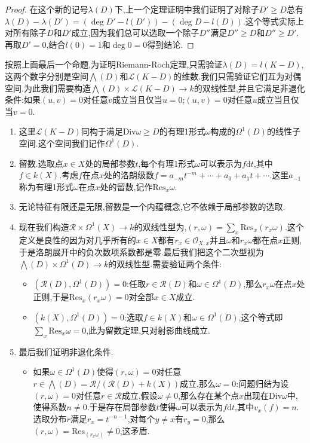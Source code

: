 \begin{enumerate}
\begin{proof}
    	在这个新的记号$\lambda(D)$下,上一个定理证明中我们证明了对除子$D'\ge D$总有$\lambda(D)-\lambda(D')=(\deg D'-l(D'))-(\deg D-l(D))$.这个等式实际上对所有除子$D$和$D'$成立,因为我们总可以选取一个除子$D''$满足$D''\ge D$和$D''\ge D'$.再取$D'=0$,结合$l(0)=1$和$\deg 0=0$得到结论.
    \end{proof}
\end{enumerate}

按照上面最后一个命题,为证明Riemann-Roch定理,只需验证$\lambda(D)=l(K-D)$,这两个数字分别是空间$\bigwedge(D)$和$\mathscr{L}(K-D)$的维数.我们只需验证它们互为对偶空间.为此我们需要构造$\bigwedge(D)\times\mathscr{L}(K-D)\to k$的双线性型,并且它满足非退化条件:如果$(u,v)=0$对任意$v$成立当且仅当$u=0$;$(u,v)=0$对任意$u$成立当且仅当$v=0$.
\begin{enumerate}
	\item 这里$\mathscr{L}(K-D)$同构于满足$\mathrm{Div}\omega\ge D$的有理1形式$\omega$构成的$\Omega^1(D)$的线性子空间.这个空间我们记作$\Omega^1(D)$.
	\item 留数.选取点$x\in X$处的局部参数$t$,每个有理1形式$\omega$可以表示为$f\mathrm{d}t$,其中$f\in k(X)$.考虑$f$在点$x$处的洛朗级数$f=a_{-m}t^{-m}+\cdots+a_0+a_1t+\cdots$.这里$a_{-1}$称为有理1形式$\omega$在点$x$处的留数,记作$\mathrm{Res}_x\omega$.
	\item 无论特征有限还是无限,留数是一个内蕴概念,它不依赖于局部参数的选取.
	\item 现在我们构造$\mathscr{R}\times\Omega^1(X)\to k$的双线性型为,$(r,\omega)=\sum_x\mathrm{Res}_x(r_x\omega)$.这个定义是良性的因为对几乎所有的$x\in X$都有$r_x\in\mathscr{O}_{X,x}$并且$\omega$和$r_x\omega$都在点$x$正则,于是洛朗展开中的负次数项系数都是零.最后我们把这个二次型视为$\bigwedge(D)\times\Omega^1(D)\to k$的双线性型.需要验证两个条件:
	\begin{itemize}
		\item $(\mathscr{R}(D),\Omega^1(D))=0$:任取$r\in\mathscr{R}(D)$和$\omega\in\Omega^1(D)$,那么$r_x\omega$在点$x$处正则,于是$\mathrm{Res}_x(r_x\omega)=0$对全部$x\in X$成立.
		\item $(k(X),\Omega^1(D))=0$:选取$f\in k(X)$和$\omega\in\Omega^1(D)$,这个等式即$\sum_x\mathrm{Res}_x\omega=0$,此为留数定理,只对射影曲线成立.
	\end{itemize}
    \item 最后我们证明非退化条件.
    \begin{itemize}
    	\item 如果$\omega\in\Omega^1(D)$使得$(r,\omega)=0$对任意$r\in\bigwedge(D)=\mathscr{R}/(\mathscr{R}(D)+k(X))$成立,那么$\omega=0$:问题归结为设$(r,\omega)=0$对任意$r\in\mathscr{R}$成立,假设$\omega\not=0$,那么存在某个点$x$出现在$\mathrm{Div}\omega$中,使得系数$n\not=0$.于是存在局部参数$t$使得$\omega$可以表示为$f\mathrm{d}t$,其中$v_x(f)=n$.选取分布$r$满足$r_x=t^{-n-1}$,对每个$y\not=x$有$r_y=0$,那么$(r,\omega)=\mathrm{Res}_(r_x\omega)\not=0$,这矛盾.

\end{itemize}
\end{enumerate}
